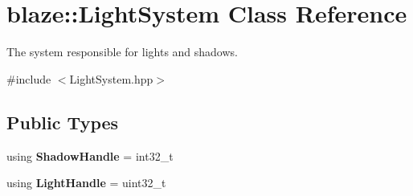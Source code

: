 \hypertarget{classblaze_1_1LightSystem}{}\section{blaze\+:\+:Light\+System Class Reference}
\label{classblaze_1_1LightSystem}


The system responsible for lights and shadows.  




{\ttfamily \#include $<$Light\+System.\+hpp$>$}

\subsection*{Public Types}
\begin{DoxyCompactItemize}
\item 
\mbox{\label{classblaze_1_1LightSystem_a494e96609eda3c2ab7803c0f96a49ffa}} 
using {\bfseries Shadow\+Handle} = int32\+\_\+t
\item 
\mbox{\label{classblaze_1_1LightSystem_a7455e76610eb791cb4d5dae1783498a8}} 
using {\bfseries Light\+Handle} = uint32\+\_\+t
\end{DoxyCompactItemize}
